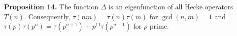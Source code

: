 \textbf{Proposition 14.} The function $\Delta$ is an eigenfunction of all Hecke operators $T(n)$. Consequently, $\tau(nm) = \tau(n)\tau(m)$ for $\gcd(n,m) = 1$ and $\tau(p)\tau(p^n) = \tau(p^{n+1}) + p^{11}\tau(p^{n-1})$ for $p$ prime.
